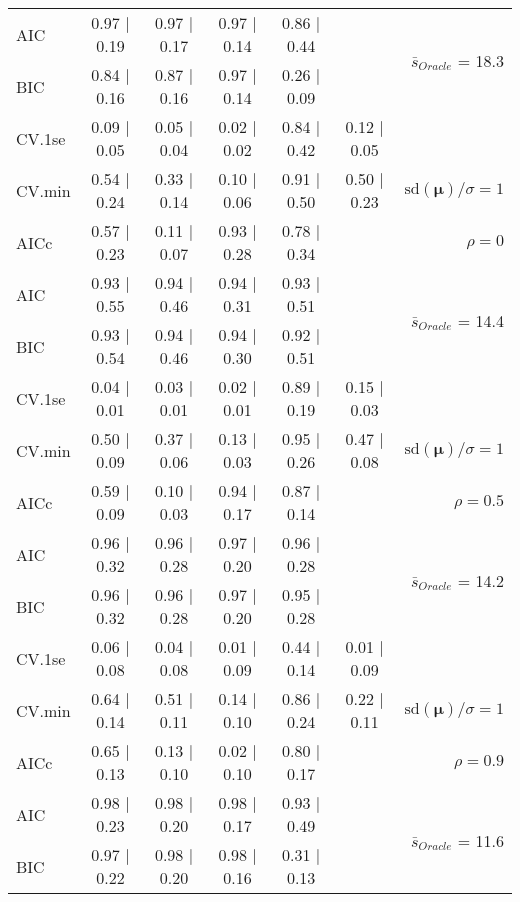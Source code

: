 \begin{table}
\begin{center}
\begin{tabular}{l*{5}{c}|r}
AIC & 0.97 $\mid$ 0.19 & 0.97 $\mid$ 0.17 & 0.97 $\mid$ 0.14 & 0.86 $\mid$ 0.44 & &  \multirow{2}{*}{$\bar{s}_{Oracle}$ = 18.3} \\
BIC & 0.84 $\mid$ 0.16 & 0.87 $\mid$ 0.16 & 0.97 $\mid$ 0.14 & 0.26 $\mid$ 0.09 & &  \\
 \hline 
CV.1se & 0.09 $\mid$ 0.05 & 0.05 $\mid$ 0.04 & 0.02 $\mid$ 0.02 & 0.84 $\mid$ 0.42 & 0.12 $\mid$ 0.05 & \\
CV.min & 0.54 $\mid$ 0.24 & 0.33 $\mid$ 0.14 & 0.10 $\mid$ 0.06 & 0.91 $\mid$ 0.50 & 0.50 $\mid$ 0.23 &  $\mathrm{sd}(\mathbf{\mu})/\sigma=1$ \\
AICc & 0.57 $\mid$ 0.23 & 0.11 $\mid$ 0.07 & 0.93 $\mid$ 0.28 & 0.78 $\mid$ 0.34 & & $\rho=0$ \\
AIC & 0.93 $\mid$ 0.55 & 0.94 $\mid$ 0.46 & 0.94 $\mid$ 0.31 & 0.93 $\mid$ 0.51 & &  \multirow{2}{*}{$\bar{s}_{Oracle}$ = 14.4} \\
BIC & 0.93 $\mid$ 0.54 & 0.94 $\mid$ 0.46 & 0.94 $\mid$ 0.30 & 0.92 $\mid$ 0.51 & &  \\
 \hline 
CV.1se & 0.04 $\mid$ 0.01 & 0.03 $\mid$ 0.01 & 0.02 $\mid$ 0.01 & 0.89 $\mid$ 0.19 & 0.15 $\mid$ 0.03 & \\
CV.min & 0.50 $\mid$ 0.09 & 0.37 $\mid$ 0.06 & 0.13 $\mid$ 0.03 & 0.95 $\mid$ 0.26 & 0.47 $\mid$ 0.08 &  $\mathrm{sd}(\mathbf{\mu})/\sigma=1$ \\
AICc & 0.59 $\mid$ 0.09 & 0.10 $\mid$ 0.03 & 0.94 $\mid$ 0.17 & 0.87 $\mid$ 0.14 & & $\rho=0.5$ \\
AIC & 0.96 $\mid$ 0.32 & 0.96 $\mid$ 0.28 & 0.97 $\mid$ 0.20 & 0.96 $\mid$ 0.28 & &  \multirow{2}{*}{$\bar{s}_{Oracle}$ = 14.2} \\
BIC & 0.96 $\mid$ 0.32 & 0.96 $\mid$ 0.28 & 0.97 $\mid$ 0.20 & 0.95 $\mid$ 0.28 & &  \\
 \hline 
CV.1se & 0.06 $\mid$ 0.08 & 0.04 $\mid$ 0.08 & 0.01 $\mid$ 0.09 & 0.44 $\mid$ 0.14 & 0.01 $\mid$ 0.09 & \\
CV.min & 0.64 $\mid$ 0.14 & 0.51 $\mid$ 0.11 & 0.14 $\mid$ 0.10 & 0.86 $\mid$ 0.24 & 0.22 $\mid$ 0.11 &  $\mathrm{sd}(\mathbf{\mu})/\sigma=1$ \\
AICc & 0.65 $\mid$ 0.13 & 0.13 $\mid$ 0.10 & 0.02 $\mid$ 0.10 & 0.80 $\mid$ 0.17 & & $\rho=0.9$ \\
AIC & 0.98 $\mid$ 0.23 & 0.98 $\mid$ 0.20 & 0.98 $\mid$ 0.17 & 0.93 $\mid$ 0.49 & &  \multirow{2}{*}{$\bar{s}_{Oracle}$ = 11.6} \\
BIC & 0.97 $\mid$ 0.22 & 0.98 $\mid$ 0.20 & 0.98 $\mid$ 0.16 & 0.31 $\mid$ 0.13 & &  \\

\end{tabular}
\end{center}
\end{table}
